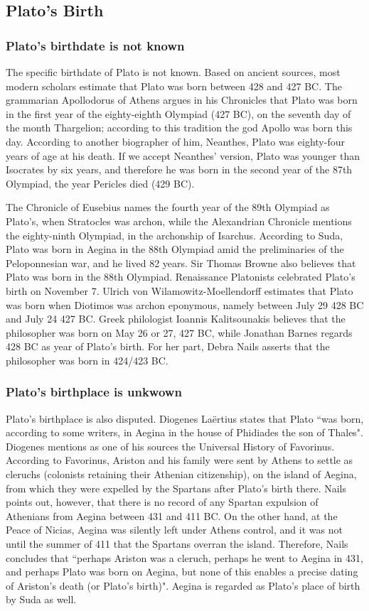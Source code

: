 \documentclass[11pt]{article}
\begin{document}
		\subsection{Plato's Birth}
			\subsubsection{Plato's birthdate is not known}
				The specific birthdate of Plato is not known. Based on ancient sources, most modern scholars estimate that Plato was born between 428 and 427 BC. The grammarian Apollodorus of Athens argues in his Chronicles that Plato was born in the first year of the eighty-eighth Olympiad (427 BC), on the seventh day of the month Thargelion; according to this tradition the god Apollo was born this day. According to another biographer of him, Neanthes, Plato was eighty-four years of age at his death. If we accept Neanthes' version, Plato was younger than Isocrates by six years, and therefore he was born in the second year of the 87th Olympiad, the year Pericles died (429 BC).

				The Chronicle of Eusebius names the fourth year of the 89th Olympiad as Plato's, when Stratocles was archon, while the Alexandrian Chronicle mentions the eighty-ninth Olympiad, in the archonship of Isarchus. According to Suda, Plato was born in Aegina in the 88th Olympiad amid the preliminaries of the Peloponnesian war, and he lived 82 years. Sir Thomas Browne also believes that Plato was born in the 88th Olympiad. Renaissance Platonists celebrated Plato's birth on November 7. Ulrich von Wilamowitz-Moellendorff estimates that Plato was born when Diotimos was archon eponymous, namely between July 29 428 BC and July 24 427 BC. Greek philologist Ioannis Kalitsounakis believes that the philosopher was born on May 26 or 27, 427 BC, while Jonathan Barnes regards 428 BC as year of Plato's birth. For her part, Debra Nails asserts that the philosopher was born in 424/423 BC.

			\subsubsection*{Plato's birthplace is unkwown}
				Plato's birthplace is also disputed. Diogenes Laërtius states that Plato ``was born, according to some writers, in Aegina in the house of Phidiades the son of Thales". Diogenes mentions as one of his sources the Universal History of Favorinus. According to Favorinus, Ariston and his family were sent by Athens to settle as cleruchs (colonists retaining their Athenian citizenship), on the island of Aegina, from which they were expelled by the Spartans after Plato's birth there. Nails points out, however, that there is no record of any Spartan expulsion of Athenians from Aegina between 431 and 411 BC. On the other hand, at the Peace of Nicias, Aegina was silently left under Athens control, and it was not until the summer of 411 that the Spartans overran the island. Therefore, Nails concludes that ``perhaps Ariston was a cleruch, perhaps he went to Aegina in 431, and perhaps Plato was born on Aegina, but none of this enables a precise dating of Ariston's death (or Plato's birth)". Aegina is regarded as Plato's place of birth by Suda as well.
\end{document}
